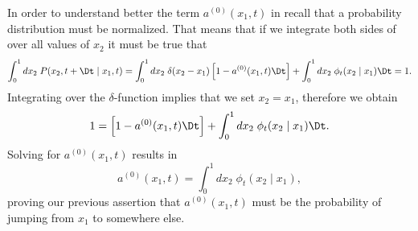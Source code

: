 In order to understand better the term $a^{(0)}(x_1, t)$ in
 recall that a probability distribution must be
normalized. That means that if we integrate both sides of
 over all values of $x_2$ it must be true that
\begin{equation}
  \int_0^1 dx_2 \; P(x_2, t + \Dt \mid x_1, t) =
  \int_0^1 dx_2 \; \delta(x_2 - x_1) \left[ 1 - a^{(0)}(x_1, t) \Dt \right]
  + \int_0^1 dx_2 \; \phi_t(x_2 \mid x_1)\Dt
  = 1.
\end{equation}
Integrating over the $\delta$-function implies that we set $x_2 = x_1$,
therefore we obtain
\begin{equation}
  1 = \left[  1 - a^{(0)}(x_1, t) \Dt\right] +
  \int_0^1 dx_2 \; \phi_t(x_2 \mid x_1)\Dt.
\end{equation}
Solving for $a^{(0)}(x_1, t)$ results in
\begin{equation}
  a^{(0)}(x_1, t) = \int_0^1 dx_2 \; \phi_t(x_2 \mid x_1),
  \label{eq_a0}
\end{equation}
proving our previous assertion that $a^{(0)}(x_1, t)$ must be the
probability of jumping from $x_1$ to somewhere else.

